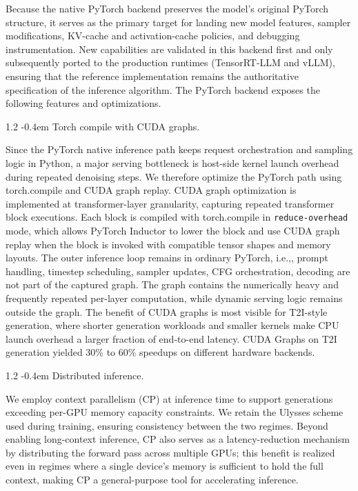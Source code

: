 \documentclass{llmxive}
\makeatletter
\providecommand{\ie}{i.e.,\xspace}
\providecommand{\paragraph}{  \@startsection{paragraph}{4}{\z@}    {1\baselineskip \@plus .2\baselineskip}    {-0.4em}    {\normalfont\normalsize\bfseries}}
\makeatother
\begin{document}
Because the native PyTorch backend preserves the model's original PyTorch structure, it serves as the primary target for landing new model features, sampler modifications, KV-cache and activation-cache policies, and debugging instrumentation. New capabilities are validated in this backend first and only subsequently ported to the production runtimes (TensorRT-LLM and vLLM), ensuring that the reference implementation remains the authoritative specification of the inference algorithm. The PyTorch backend exposes the following features and optimizations.

\paragraph{Torch compile with CUDA graphs.}

Since the PyTorch native inference path keeps request orchestration and sampling logic in Python, a major serving bottleneck is host-side kernel launch overhead during repeated denoising steps. We therefore optimize the PyTorch path using torch.compile and CUDA graph replay. CUDA graph optimization is implemented at transformer-layer granularity, capturing repeated transformer block executions. Each block is compiled with torch.compile in \texttt{reduce-overhead} mode, which allows PyTorch Inductor to lower the block and use CUDA graph replay when the block is invoked with compatible tensor shapes and memory layouts. The outer inference loop remains in ordinary PyTorch, \ie, prompt handling, timestep scheduling, sampler updates, CFG orchestration, decoding are not part of the captured graph. The graph contains the numerically heavy and frequently repeated per-layer computation, while dynamic serving logic remains outside the graph. The benefit of CUDA graphs is most visible for T2I-style generation, where shorter generation workloads and smaller kernels make CPU launch overhead a larger fraction of end-to-end latency. CUDA Graphs on T2I generation yielded 30\% to 60\% speedups on different hardware backends.

\paragraph{Distributed inference.}

We employ context parallelism (CP) at inference time to support generations exceeding per-GPU memory capacity constraints. We retain the Ulysses scheme~\citep{deepspeed_ulysses} used during training, ensuring consistency between the two regimes. Beyond enabling long-context inference, CP also serves as a latency-reduction mechanism by distributing the forward pass across multiple GPUs; this benefit is realized even in regimes where a single device's memory is sufficient to hold the full context, making CP a general-purpose tool for accelerating inference.
\end{document}
